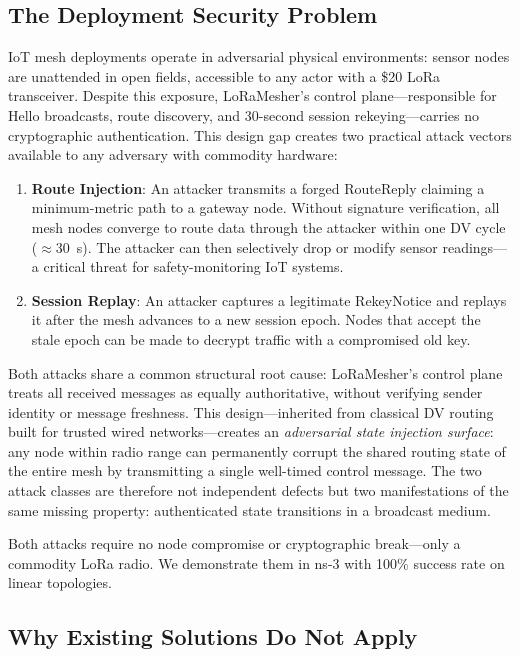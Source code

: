 \documentclass[10pt,journal,compsoc]{IEEEtran}
\begin{document}
\subsection{The Deployment Security Problem}

IoT mesh deployments operate in adversarial physical environments:
sensor nodes are unattended in open fields, accessible to any
actor with a \$20 LoRa transceiver. Despite this exposure,
LoRaMesher's control plane—responsible for Hello broadcasts,
route discovery, and 30-second session rekeying—carries no
cryptographic authentication. This design gap creates two practical
attack vectors available to any adversary with commodity hardware:

\begin{enumerate}
  \item \textbf{Route Injection}: An attacker transmits a forged
    RouteReply claiming a minimum-metric path to a gateway node.
    Without signature verification, all mesh nodes converge to
    route data through the attacker within one DV cycle ($\approx$30~s).
    The attacker can then selectively drop or modify sensor readings—
    a critical threat for safety-monitoring IoT systems.

  \item \textbf{Session Replay}: An attacker captures a legitimate
    RekeyNotice and replays it after the mesh advances to a new
    session epoch. Nodes that accept the stale epoch can be made
    to decrypt traffic with a compromised old key.
\end{enumerate}

Both attacks share a common structural root cause: LoRaMesher's
control plane treats all received messages as equally authoritative,
without verifying sender identity or message freshness. This
design—inherited from classical DV routing built for trusted wired
networks—creates an \emph{adversarial state injection surface}:
any node within radio range can permanently corrupt the shared
routing state of the entire mesh by transmitting a single
well-timed control message. The two attack classes are therefore
not independent defects but two manifestations of the same missing
property: authenticated state transitions in a broadcast medium.

Both attacks require no node compromise or cryptographic break—only
a commodity LoRa radio. We demonstrate them in ns-3 with 100\%
success rate on linear topologies.

\subsection{Why Existing Solutions Do Not Apply}
\end{document}
